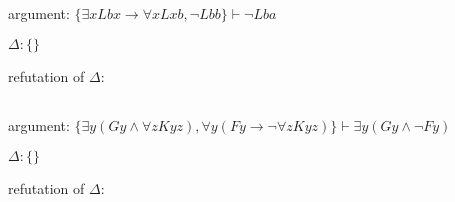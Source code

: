 \documentclass[a4paper,11pt]{article}
\begin{document}

\subsection{}

argument: $\{ \exists x Lbx \rightarrow \forall x Lxb, \lnot Lbb \} \vdash \lnot Lba $

\bigskip

\noindent $\Delta: \{ \}$

\bigskip

\noindent refutation of $\Delta:$


\subsection{}

argument: $\{ \exists y(Gy \land \forall z Kyz), \forall y(Fy \rightarrow \lnot \forall z Kyz) \} \vdash \exists y(Gy \land \lnot Fy) $

\bigskip

\noindent $\Delta: \{ \} $

\bigskip

\noindent refutation of $\Delta:$
\end{document}
